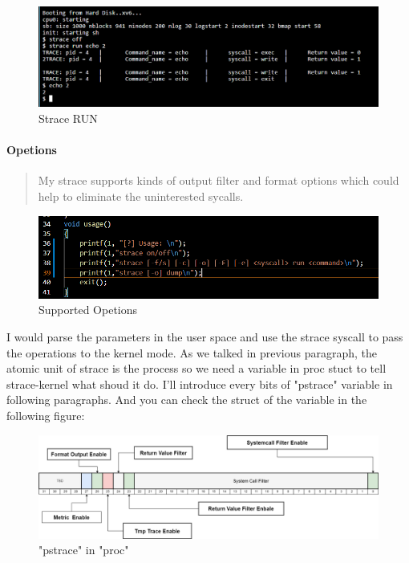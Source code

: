 \documentclass[11pt,oneside,a4paper]{article}
\begin{document}
\begin{figure}[H]
    \includegraphics[width=4.75in]{1-18.png}
    \centering
    \caption{Strace RUN}
\end{figure}

\paragraph*{Opetions}

\begin{quotation}
    My strace supports kinds of output filter and format options which could help to 
eliminate the uninterested sycalls. 
\end{quotation}

\begin{figure}[H]
    \includegraphics[width=4.75in]{1-19.png}
    \centering
    \caption{Supported Opetions}
\end{figure}

I would parse the parameters in the user space and use the strace syscall to 
pass the operations to the kernel mode. 
As we talked in previous paragraph, the atomic unit of strace is the process so 
we need a variable in proc stuct to tell strace-kernel what shoud it do. I'll 
introduce every bits of "pstrace" variable in following paragraphs. And you can 
check the struct of the variable in the following figure:

\begin{figure}[H]
    \includegraphics[width=4.75in]{pstrace.png}
    \centering
    \caption{"pstrace" in "proc"}
\end{figure}
\end{document}
